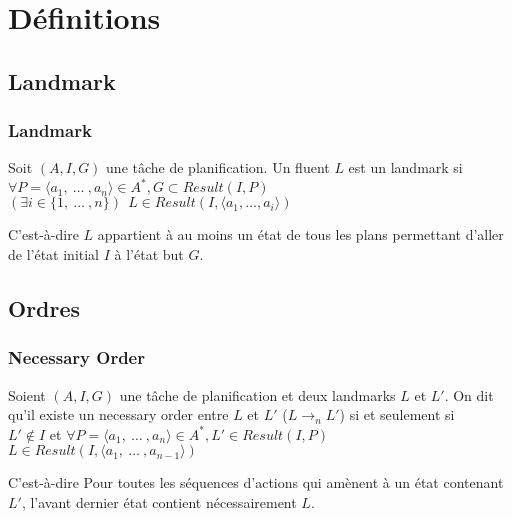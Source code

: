 \section{Définitions}
  \subsection{Landmark}
\begin{frame}
	\frametitle{Landmark}

  \begin{definition}[Landmark]
    Soit $(A, I, G)$ une tâche de planification. Un fluent $L$ est un landmark si
    $\forall P = \langle a_1,~\dots~, a_n\rangle \in A^*, G \subset Result(I, P)$
    $(\exists i \in \{1,~\dots~,n\})~~L \in Result(I, \langle a_1, \dots, a_i  \rangle)$
  \end{definition}

  \begin{block}{C'est-à-dire}
    $L$ appartient à au moins un état de tous les plans permettant d'aller de l'état initial $I$ à l'état but $G$.
  \end{block}
\end{frame}

  \subsection{Ordres}
\begin{frame}
  \frametitle{Necessary Order}

  \begin{definition}[$L \rightarrow_{n} L'$]
    Soient $(A, I, G)$ une tâche de planification et deux landmarks $L$ et $L'$. On dit qu'il existe un necessary order entre $L$ et $L'$ ($L \rightarrow_{n} L'$) si et seulement si\\
    $L' \notin  I$ et $\forall P = \langle a_1,~\dots~, a_n\rangle \in A^*, L' \in Result(I, P)$
    $L \in Result(I, \langle a_1,~\dots~, a_{n-1}\rangle)$
  \end{definition}

  \begin{block}{C'est-à-dire}
    Pour toutes les séquences d'actions qui amènent à un état contenant $L'$, l'avant dernier état contient nécessairement $L$.
  \end{block}
\end{frame}


